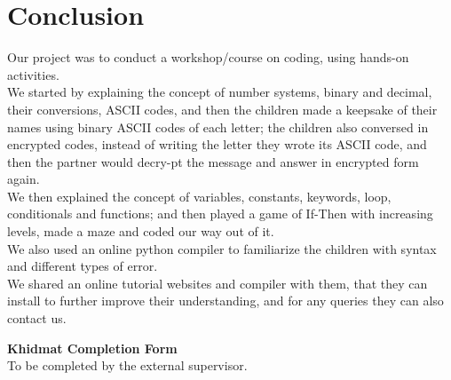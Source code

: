 \documentclass{article}
\begin{document}
\section*{Conclusion}

Our project was to conduct a workshop/course on coding, using hands-on activities. \\
We started by explaining the concept of number systems, binary and decimal, their conversions, ASCII codes, and then the children made a keepsake of their names using binary ASCII codes of each letter; the children also conversed in encrypted codes, instead of writing the letter they wrote its ASCII code, and then the partner would decry-pt the message and answer in encrypted form again. \\
We then explained the concept of variables, constants, keywords, loop, conditionals and functions; and then played a game of If-Then with increasing levels, made a maze and coded our way out of it. \\
We also used an online python compiler to familiarize the children with syntax and different types of error. \\
We shared an online tutorial websites and compiler with them, that they can install to further improve their understanding, and for any queries they can also contact us.

\newpage
\thispagestyle{empty}

\begin{center}
  {\Large\bf Khidmat Completion Form}\\[5pt]
  \small To be completed by the external supervisor.  
\end{center}
\bigskip
\end{document}
